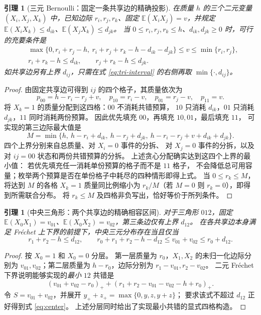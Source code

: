 \documentclass[11pt,a4paper]{ctexart}
\newtheorem{lemma}[theorem]{引理}
\theoremstyle{remark}\newtheorem{remark}[theorem]{说明}
\newcommand{\EE}{\mathbb E}
\begin{document}
\begin{lemma}[三元 Bernoulli：固定一条共享边的精确投影]\label{lem:triangle}
在质量 $h$ 的三个二元变量 $(X_i,X_j,X_k)$ 中，已知边际
$r_i,r_j,r_k$、固定 $\EE(X_iX_j)=v$，并规定
$\EE(X_iX_k)\le d_{ik}$、$\EE(X_jX_k)\le d_{jk}$。
当 $0\le r_i,r_j,r_k\le h$、$d_{ik},d_{jk}\ge0$ 时，可行的充要条件是
\begin{align}
&\max\{0,r_i+r_j-h,\ r_i+r_j+r_k-h-d_{ik}-d_{jk}\}\le v\le\min\{r_i,r_j\},\label{eq:tri-interval}\\
&r_i+r_k-h\le d_{ik},\qquad r_j+r_k-h\le d_{jk}.\label{eq:tri-pair}
\end{align}
如共享边另有上界 $d_{ij}$，只需在式 \eqref{eq:tri-interval} 的右侧再取 $\min\{\cdot,d_{ij}\}$。
\end{lemma}
\begin{proof}
由固定共享边可得到 $ij$ 的四个格子，其质量依次为
\[
p_{00}=h-r_i-r_j+v,\quad p_{10}=r_i-v,\quad
p_{01}=r_j-v,\quad p_{11}=v.
\]
将 $X_k=1$ 的质量分配到这四格：$00$ 不消耗共错预算，
$10$ 只消耗 $d_{ik}$，$01$ 只消耗 $d_{jk}$，$11$ 同时消耗两份预算。
因此优先填充 $00$，再填充 $10,01$，最后填充 $11$，
可实现的第三边际最大值是
\[
M=\min\{h,\ h-r_i+d_{ik},\ h-r_j+d_{jk},\
h-r_i-r_j+v+d_{ik}+d_{jk}\}.
\]
四个上界分别来自总质量、对 $X_i=0$ 事件的分拆、
对 $X_j=0$ 事件的分拆，以及对 $ij=00$ 状态和两份共错预算的分拆。
上述贪心分配确实达到这四个上界的最小值：
若优先填充任一消耗单份预算的格子而不是 $11$ 格子，
不会降低总可用容量；枚举两个预算是否在单份格子中耗尽的四种情形即得上式。
当 $0\le r_k\le M$，将达到 $M$ 的各格 $X_k=1$ 质量同比例缩小为 $r_k/M$（若 $M=0$ 则 $r_k=0$），即得到所需联合分布。
将 $r_k\le M$ 及四格非负写出，恰好等价于所列条件。
\end{proof}

\begin{lemma}[中央三角形：两个共享边的精确相容区间]\label{lem:center}
对于三角形 $012$，固定
$\EE(X_0X_1)=v_{01}$、$\EE(X_0X_2)=v_{02}$，第三条边仅有上界 $d_{12}$。
在各共享边本身满足 Fr\'echet 上下界的前提下，中央三元分布存在当且仅当
\begin{equation}\label{eq:center}
 r_1+r_2-h\le d_{12},\qquad
 r_0+r_1+r_2-h-d_{12}\le v_{01}+v_{02}\le r_0+d_{12}.
\end{equation}
\end{lemma}
\begin{proof}
按 $X_0=1$ 和 $X_0=0$ 分层。
第一层质量为 $r_0$，$X_1,X_2$ 的未归一化边际分别为
$v_{01},v_{02}$；第二层质量为 $h-r_0$，边际分别为
$r_1-v_{01},r_2-v_{02}$。
二元 Fr\'echet 下界说明能够实现的\emph{最小} $12$ 共错是
\[
(v_{01}+v_{02}-r_0)_+
+(r_1+r_2-v_{01}-v_{02}-h+r_0)_+.
\]
令 $S=v_{01}+v_{02}$，并展开 $y_++z_+=\max\{0,y,z,y+z\}$；
要求该式不超过 $d_{12}$ 正好得到式 \eqref{eq:center}。
上述分层同时给出了实现最小共错的显式四格构造。
\end{proof}
\end{document}
